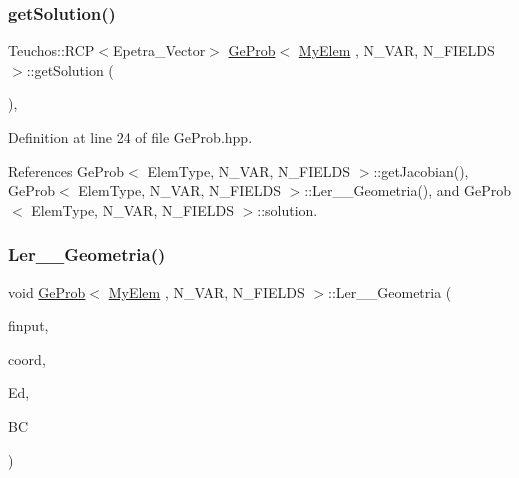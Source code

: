 \mbox{\label{classGeProb_ae29860923e40758aa1a7810556bb0f8e}} 
\subsubsection{\texorpdfstring{get\+Solution()}{getSolution()}}
{\footnotesize\ttfamily Teuchos\+::\+R\+CP$<$Epetra\+\_\+\+Vector$>$ \hyperlink{classGeProb}{Ge\+Prob}$<$ \hyperlink{DG__Prob_8h_a83cd887ced9a6587428f267e50cd4787}{My\+Elem} , N\+\_\+\+V\+AR, N\+\_\+\+F\+I\+E\+L\+DS $>$\+::get\+Solution (\begin{DoxyParamCaption}{ }\end{DoxyParamCaption})\hspace{0.3cm}{\ttfamily [inline]}, {\ttfamily [inherited]}}



Definition at line 24 of file Ge\+Prob.\+hpp.



References Ge\+Prob$<$ Elem\+Type, N\+\_\+\+V\+A\+R, N\+\_\+\+F\+I\+E\+L\+D\+S $>$\+::get\+Jacobian(), Ge\+Prob$<$ Elem\+Type, N\+\_\+\+V\+A\+R, N\+\_\+\+F\+I\+E\+L\+D\+S $>$\+::\+Ler\+\_\+\+\_\+\+Geometria(), and Ge\+Prob$<$ Elem\+Type, N\+\_\+\+V\+A\+R, N\+\_\+\+F\+I\+E\+L\+D\+S $>$\+::solution.

\mbox{\label{classGeProb_a1b1545b917023458df409bd97573bac5}} 
\subsubsection{\texorpdfstring{Ler\+\_\+\+\_\+\+Geometria()}{Ler\_\_Geometria()}}
{\footnotesize\ttfamily void \hyperlink{classGeProb}{Ge\+Prob}$<$ \hyperlink{DG__Prob_8h_a83cd887ced9a6587428f267e50cd4787}{My\+Elem} , N\+\_\+\+V\+AR, N\+\_\+\+F\+I\+E\+L\+DS $>$\+::Ler\+\_\+\+\_\+\+Geometria (\begin{DoxyParamCaption}\item[{F\+I\+LE $\ast$}]{finput,  }\item[{double $\ast$}]{coord,  }\item[{int $\ast$}]{Ed,  }\item[{int $\ast$}]{BC }\end{DoxyParamCaption})\hspace{0.3cm}{\ttfamily [inherited]}}



